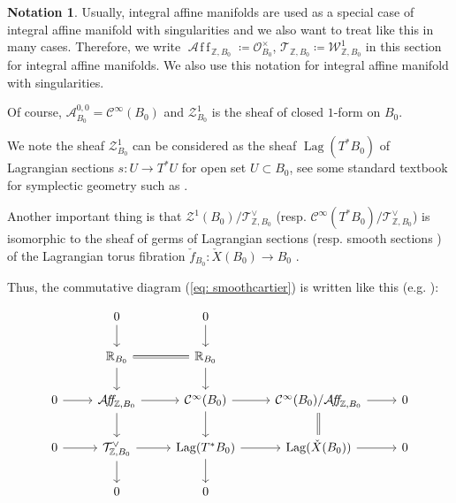 \documentclass[a4paper,dvipdfmx,reqno,12pt]{amsart}
\theoremstyle{definition}
\newtheorem{Not}[Thm]{Notation}
\newcommand{\deq}{\coloneqq}
\newcommand{\Z}{\mathbb{Z}}%
\newcommand{\mb}[1]{\mathbb{#1}}%
\newcommand{\mcal}[1]{\mathcal{#1}}%
\newcommand{\opn}[1]{\operatorname{#1}}
\newcommand{\AffS}{{\mathop{\mcal{A}\!f\!\!f\!}\nolimits}}
\numberwithin{equation}{section}
\begin{document}
\begin{Not}
  Usually, integral affine manifolds are used as a special case of integral affine manifold with singularities and we also want to treat like this in many cases.
  Therefore, we write $\AffS_{\Z,B_0}\deq \mcal{O}^{\times}_{B_0}$, $\mcal{T}_{\Z,B_0}\deq \mcal{W}_{\Z,B_0}^{1}$ in this section for integral affine manifolds. We also use this notation for integral affine manifold with singularities.
\end{Not}

Of course, $\mcal{A}_{B_0}^{0,0}=\mcal{C}^{\infty}(B_0)$ and
 $\mcal{Z}^{1}_{B_0}$ is the sheaf of closed $1$-form on $B_0$.



We note the sheaf $\mcal{Z}^{1}_{B_0}$ can be considered as the sheaf 
$\opn{Lag}(T^{*}B_0)$ of Lagrangian sections 
$s:U \to T^{*}U$ for open set $U \subset B_0$, 
see some standard textbook for symplectic geometry 
such as \cite[3.2]{MR1853077}.

Another important thing is that 
$\mcal{Z}^{1}(B_0)/\mcal{T}_{\Z,B_0}^{\vee}$
 (resp. $\mcal{C}^{\infty}(T^{*}B_0)/\mcal{T}_{\Z,B_0}^{\vee}$) 
is isomorphic to the sheaf of germs of Lagrangian sections 
(resp. smooth sections ) of the Lagrangian torus fibration 
$\check{f}_{B_0}\colon \check{X}(B_0)\to B_0$ 
\cite[(2.7), (2.11)]{duistermaatGlobalActionangleCoordinates1980a}.


Thus, the commutative diagram (\ref{eq: smoothcartier}) is written like this 
(e.g. \cite[p.468]{aspinwallDirichletBranesMirror2009}):

\begin{equation} \label{eq:affinecartier}
  \begin{tikzcd}
    & 0 \arrow[d]    & 0 \arrow[d]           &                      &   \\
    & \mb{R}_{B_0} \arrow[r,equal] \arrow[d]                & \mb{R}_{B_0} \arrow[d]           &                      &   \\
    0 \arrow[r] & \AffS_{\Z,B_0} \arrow[r] \arrow[d]         & \mcal{C}^{\infty}(B_0) \arrow[r] \arrow[d] & \mcal{C}^{\infty}(B_0)/\AffS_{\Z,B_0}  \arrow[r] \arrow[d,equal] & 0 \\
    0 \arrow[r] & \mcal{T}_{\Z,B_0}^{\vee} \arrow[r] \arrow[d] & \opn{Lag}(T^{*}B_0) \arrow[r] \arrow[d]  & \opn{Lag}(\check{X}(B_0)) \arrow[r]   & 0 \\
    & 0 & 0 &  &
  \end{tikzcd}
\end{equation}
\end{document}
